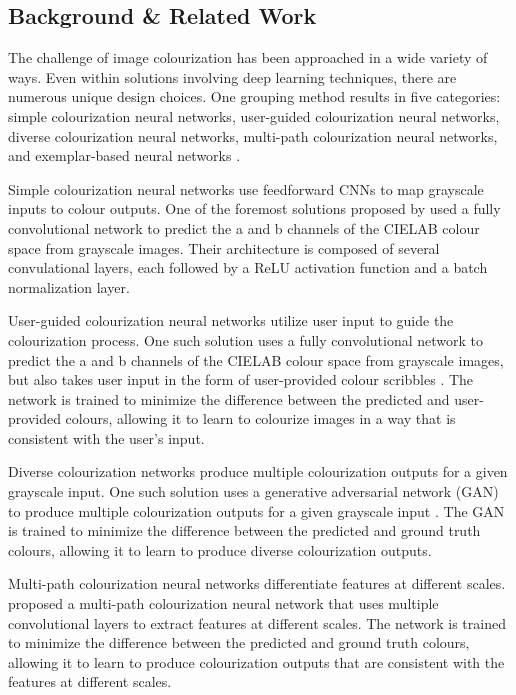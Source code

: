 \documentclass{article} %
\begin{document}
\subsection{Background \& Related Work}

The challenge of image colourization has been approached in a wide variety of ways. Even within solutions involving deep learning
techniques, there are numerous unique design choices. One grouping method results in five categories: simple colourization neural networks,
user-guided colourization neural networks, diverse colourization neural networks, multi-path colourization neural networks, and exemplar-based
neural networks \citep{zeger2021grayscale}. 

Simple colourization neural networks use feedforward CNNs to map grayscale inputs to colour outputs. One of the foremost solutions proposed by 
\citet{zhang2016colorful} used a fully convolutional network to predict the a and b channels of the CIELAB colour space from grayscale images. Their 
architecture is composed of several convulational layers, each followed by a ReLU activation function and a batch normalization layer.

User-guided colourization neural networks utilize user input to guide the colourization process. One such solution uses a
fully convolutional network to predict the a and b channels of the CIELAB colour space from grayscale images, but also takes user input in the form of
user-provided colour scribbles \citep{zhang2017real}. The network is trained to minimize the difference between the predicted and user-provided colours, allowing it to
learn to colourize images in a way that is consistent with the user's input. 

Diverse colourization networks produce multiple colourization outputs for a given grayscale input. One such solution uses
a generative adversarial network (GAN) to produce multiple colourization outputs for a given grayscale input \citep{Vitoria2020ChromaGAN}. The GAN is trained to minimize the difference
between the predicted and ground truth colours, allowing it to learn to produce diverse colourization outputs. 

Multi-path colourization neural networks differentiate features at different scales. \citet{Iizuka2016Colourization} proposed a multi-path
colourization neural network that uses multiple convolutional layers to extract features at different scales. The network is trained to minimize the difference
between the predicted and ground truth colours, allowing it to learn to produce colourization outputs that are consistent with the features at different scales. 
\end{document}
